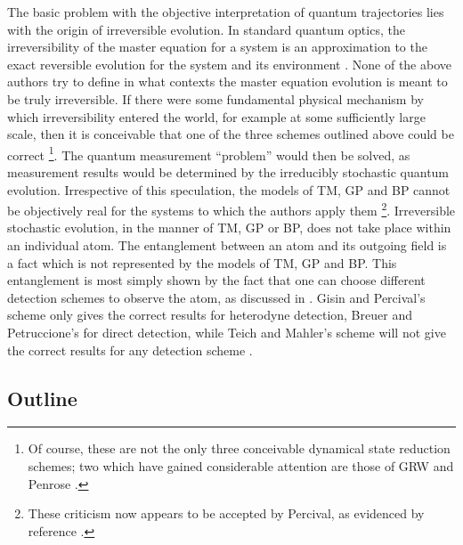 \documentclass[12pt]{article}
\begin{document}
The basic problem with the objective interpretation of quantum 
trajectories lies with the origin of irreversible evolution. In standard
quantum optics, the irreversibility of the master equation for a system 
is an approximation to the exact reversible evolution for the system and its
environment \cite{Gar91}. None of the above authors try to define in what contexts
the master equation  evolution is meant to be truly irreversible. If there were some
fundamental physical mechanism by  which irreversibility entered the world, for
example at some sufficiently  large scale, then it is conceivable that one of the
three schemes outlined above could be correct \footnote{Of course, these are not the
only three conceivable dynamical  state reduction schemes; two which have gained
considerable attention are those of GRW \cite{GRW} and Penrose \cite{Pen90}.}. The
quantum measurement ``problem'' would then be solved,  as measurement results would
be determined by the irreducibly stochastic quantum  evolution. Irrespective of this
speculation, the models of TM, GP and BP cannot be  objectively real for the systems
to which the authors apply them \footnote{These criticism now appears to be accepted
by Percival, as evidenced by reference \cite{Per94}.}. Irreversible stochastic
evolution, in the manner of TM, GP or BP, does not take place within an individual
atom. The entanglement between an atom and its outgoing field  is a fact which is not
represented by the models of TM, GP and BP. This  entanglement is most simply shown
by the fact that one can choose different detection schemes to observe the atom, as
discussed in \cite{WisMil93c}. Gisin and Percival's scheme only gives the correct
results for heterodyne detection, Breuer and Petruccione's for direct detection,
while Teich and Mahler's scheme will not give the correct results for any detection
scheme \cite{WisMil93c}.

\subsection{Outline}
\end{document}
